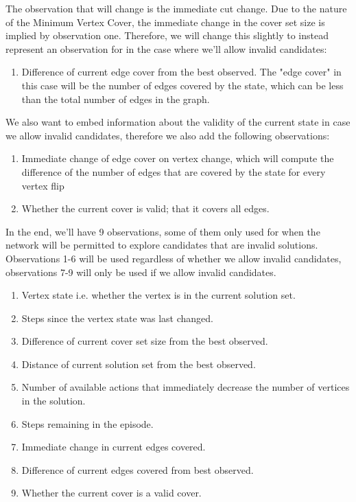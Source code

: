 \documentclass{article}
\begin{document}
The observation that will change is the immediate cut change. Due to the nature of the Minimum Vertex Cover, the immediate change in the cover set size is implied by observation one. Therefore, we will change this slightly to instead represent an observation for in the case where we'll allow invalid candidates: 

\begin{enumerate}
    \item Difference of current edge cover from the best observed. The "edge cover" in this case will be the number of edges covered by the state, which can be less than the total number of edges in the graph.
\end{enumerate}

We also want to embed information about the validity of the current state in case we allow invalid candidates, therefore we also add the following observations: 

\begin{enumerate}
    \item Immediate change of edge cover on vertex change, which will compute the difference of the number of edges that are covered by the state for every vertex flip
    \item Whether the current cover is valid; that it covers all edges.
\end{enumerate}

In the end, we'll have 9 observations, some of them only used for when the network will be permitted to explore candidates that are invalid solutions. Observations 1-6 will be used regardless of whether we allow invalid candidates, observations 7-9 will only be used if we allow invalid candidates.

\begin{enumerate}
    \item Vertex state i.e. whether the vertex is in the current solution set.
    \item Steps since the vertex state was last changed.
    \item Difference of current cover set size from the best observed.
    \item Distance of current solution set from the best observed. 
    \item Number of available actions that immediately decrease the number of vertices in the solution.
    \item Steps remaining in the episode.
    \item Immediate change in current edges covered.
    \item Difference of current edges covered from best observed.
    \item Whether the current cover is a valid cover.
\end{enumerate}
\end{document}
